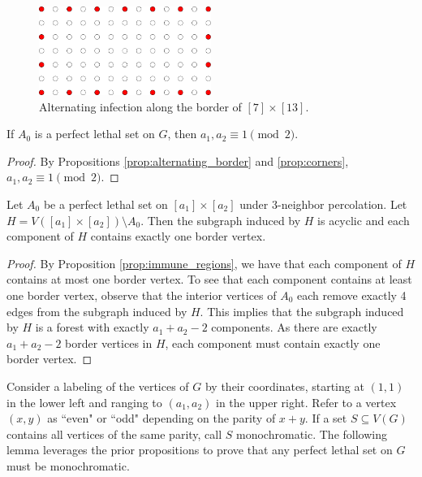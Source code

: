 \begin{figure}[]
\centering
\includegraphics[width=0.5\textwidth]{figures/6/border.pdf}
\caption{Alternating infection along the border of $[7] \times [13]$.}
\label{fig:border}
\end{figure} 

\begin{prop}
\label{prop:odd_by_odd}
If $A_0$ is a perfect lethal set on $G$, then $a_1, a_2 \equiv 1 \pmod 2$.
\end{prop}

\begin{proof}
By Propositions \ref{prop:alternating_border} and \ref{prop:corners}, $a_1, a_2 \equiv 1 \pmod 2$.
\end{proof}

\begin{prop}
\label{prop:one_border_vertex}
Let $A_0$ be a perfect lethal set on $[a_1] \times [a_2]$ under 3-neighbor percolation. Let $H = V([a_1] \times [a_2]) \setminus A_0$. Then the subgraph induced by $H$ is acyclic and each component of $H$ contains exactly one border vertex.
\end{prop}

\begin{proof}
By Proposition \ref{prop:immune_regions}, we have that each component of $H$ contains at most one border vertex. To see that each component contains at least one border vertex, observe that the interior vertices of $A_0$ each remove exactly 4 edges from the subgraph induced by $H$. This implies that the subgraph induced by $H$ is a forest with exactly $a_1 + a_2 - 2$ components. As there are exactly $a_1 + a_2 - 2$ border vertices in $H$, each component must contain exactly one border vertex.
\end{proof}

Consider a labeling of the vertices of $G$ by their coordinates, starting at $(1,1)$ in the lower left and ranging to $(a_1,a_2)$ in the upper right. Refer to a vertex $(x,y)$ as ``even" or ``odd" depending on the parity of $x+y$. If a set $S \subseteq V(G)$ contains all vertices of the same parity, call $S$ monochromatic. The following lemma leverages the prior propositions to prove that any perfect lethal set on $G$ must be monochromatic.

